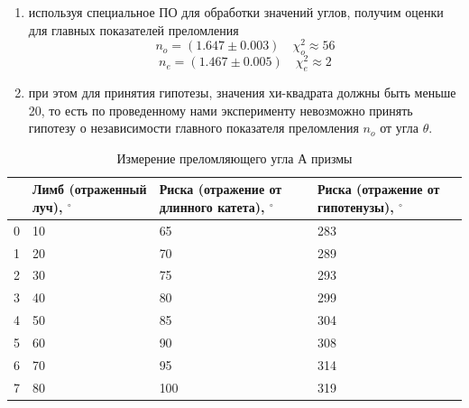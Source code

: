\documentclass[12pt]{article}
\begin{document}
\begin{enumerate}
\begin{enumerate}
            \item используя специальное ПО для обработки значений углов,
            получим оценки для главных показателей преломления
            \[n_o = (1.647 \pm 0.003) \quad \chi^2_o \approx 56\]
            \[n_e = (1.467 \pm 0.005) \quad \chi^2_e \approx 2\]
            \item при этом для принятия гипотезы, значения хи-квадрата должны быть меньше 20,
            то есть по проведенному нами эксперименту невозможно принять гипотезу
            о независимости главного показателя преломления $n_o$ от угла $\theta$.
        \end{enumerate}
    \end{enumerate}
    \begin{table}
        \centering
        \caption{Измерение преломляющего угла А призмы}
        \label{tab:tab1}
        \begin{tabular}{|p{0.5cm}|p{3cm}|p{4cm}|p{4cm}|}
            \hline
            {} & Лимб (отраженный луч), $^{\circ}$ & Риска (отражение от длинного катета), $^{\circ}$ & Риска (отражение от гипотенузы), $^{\circ}$ \\\hline
            0  & 10                                & 65                                               & 283                                         \\
            1  & 20                                & 70                                               & 289                                         \\
            2  & 30                                & 75                                               & 293                                         \\
            3  & 40                                & 80                                               & 299                                         \\
            4  & 50                                & 85                                               & 304                                         \\
            5  & 60                                & 90                                               & 308                                         \\
            6  & 70                                & 95                                               & 314                                         \\
            7  & 80                                & 100                                              & 319                                         \\

\end{tabular}
\end{table}
\end{document}
